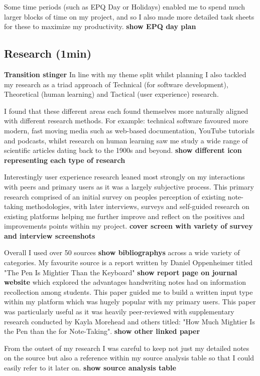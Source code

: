 Some time periods (such as EPQ Day or Holidays) enabled me to spend much larger blocks of time on my project, and so I also made more detailed task sheets for these to maximize my productivity. \textbf{show EPQ day plan}


\subsection*{Research (1min)}
\textbf{Transition stinger}
In line with my theme split whilst planning I also tackled my research as a triad approach of Technical (for software development), Theoretical (human learning) and Tactical (user experience) research.

I found that these different areas each found themselves more naturally aligned with different research methods. For example: technical software favoured more modern, fast moving media such as web-based documentation, YouTube tutorials and podcasts, whilst research on human learning saw me study a wide range of scientific articles dating back to the 1900s and beyond. \textbf{show different icon representing each type of research}

Interestingly user experience research leaned most strongly on my interactions with peers and primary users as it was a largely subjective process. This primary research comprised of an initial survey on peoples perception of existing note-taking methodologies, with later interviews, surveys and self-guided research on existing platforms helping me further improve and reflect on the positives and improvements points within my project. \textbf{cover screen with variety of survey and interview screenshots}


Overall I used over 50 sources \textbf{show bibliographys} across a wide variety of categories. My favourite source is a report written by Daniel Oppenheimer titled "The Pen Is Mightier Than the Keyboard" \textbf{show report page on journal website} which explored the advantages handwriting notes had on information recollection among students. This paper guided me to build a written input type within my platform which was hugely popular with my primary users. This paper was particularly useful as it was heavily peer-reviewed with supplementary research conducted by Kayla Morehead and others titled: "How Much Mightier Is the Pen than the     for Note-Taking". \textbf{show other linked paper }

From the outset of my research I was careful to keep not just my detailed notes on the source but also a reference within my source analysis table so that I could easily refer to it later on. \textbf{show source analysis table} 

